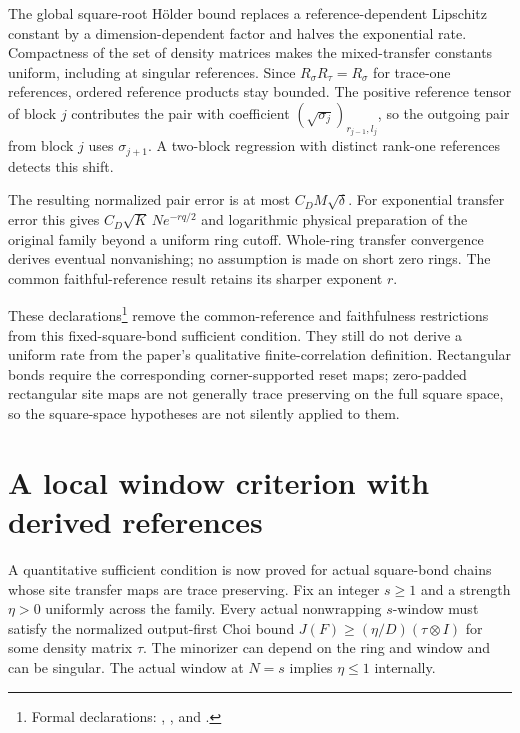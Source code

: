 \documentclass{article}
\begin{document}
The global square-root H\"older bound replaces a reference-dependent
Lipschitz constant by a dimension-dependent factor and halves the exponential
rate. Compactness of the set of density matrices makes the mixed-transfer
constants uniform, including at singular references. Since
$R_\sigma R_\tau=R_\sigma$ for trace-one references, ordered reference
products stay bounded. The positive reference tensor of block $j$ contributes
the pair with coefficient $(\sqrt{\sigma_j})_{r_{j-1},l_j}$, so the outgoing
pair from block $j$ uses $\sigma_{j+1}$. A two-block regression with distinct
rank-one references detects this shift.

The resulting normalized pair error is at most $C_D M\sqrt\delta$.
For exponential transfer error this gives
$C_D\sqrt K\,N e^{-rq/2}$ and logarithmic physical preparation of the
original family beyond a uniform ring cutoff. Whole-ring transfer
convergence derives eventual nonvanishing; no assumption is made on short
zero rings. The common faithful-reference result retains its sharper
exponent $r$.

These declarations\footnote{Formal declarations:
    ,
    , and
    .}
remove the common-reference and faithfulness restrictions from this
fixed-square-bond sufficient condition. They still do not derive a uniform
rate from the paper's qualitative finite-correlation definition. Rectangular
bonds require the corresponding corner-supported reset maps; zero-padded
rectangular site maps are not generally trace preserving on the full square
space, so the square-space hypotheses are not silently applied to them.

\section{A local window criterion with derived references}
A quantitative sufficient condition is now proved for actual square-bond
chains whose site transfer maps are trace preserving. Fix an integer
$s\ge1$ and a strength $\eta>0$ uniformly across the family. Every actual
nonwrapping $s$-window must satisfy the normalized output-first Choi bound
$J(F)\ge(\eta/D)(\tau\otimes I)$ for some density matrix $\tau$.
The minorizer can depend on the ring and window and can be singular.
The actual window at $N=s$ implies $\eta\le1$ internally.
\end{document}

